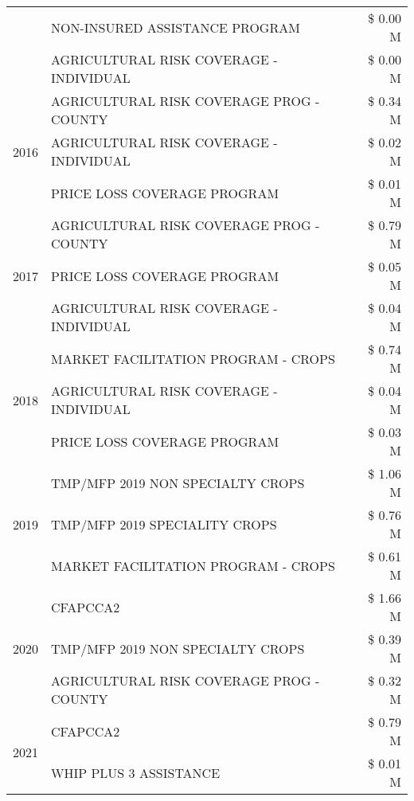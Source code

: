 \begin{tabular}{llr}
 & NON-INSURED ASSISTANCE PROGRAM & \$ 0.00 M \\
 & AGRICULTURAL RISK COVERAGE - INDIVIDUAL & \$ 0.00 M \\
\cline{1-3}
\multirow[t]{3}{*}{2016} & AGRICULTURAL RISK COVERAGE PROG - COUNTY & \$ 0.34 M \\
 & AGRICULTURAL RISK COVERAGE - INDIVIDUAL & \$ 0.02 M \\
 & PRICE LOSS COVERAGE PROGRAM & \$ 0.01 M \\
\cline{1-3}
\multirow[t]{3}{*}{2017} & AGRICULTURAL RISK COVERAGE PROG - COUNTY & \$ 0.79 M \\
 & PRICE LOSS COVERAGE PROGRAM & \$ 0.05 M \\
 & AGRICULTURAL RISK COVERAGE - INDIVIDUAL & \$ 0.04 M \\
\cline{1-3}
\multirow[t]{3}{*}{2018} & MARKET FACILITATION PROGRAM - CROPS & \$ 0.74 M \\
 & AGRICULTURAL RISK COVERAGE - INDIVIDUAL & \$ 0.04 M \\
 & PRICE LOSS COVERAGE PROGRAM & \$ 0.03 M \\
\cline{1-3}
\multirow[t]{3}{*}{2019} & TMP/MFP 2019 NON SPECIALTY CROPS & \$ 1.06 M \\
 & TMP/MFP 2019 SPECIALITY CROPS & \$ 0.76 M \\
 & MARKET FACILITATION PROGRAM - CROPS & \$ 0.61 M \\
\cline{1-3}
\multirow[t]{3}{*}{2020} & CFAPCCA2 & \$ 1.66 M \\
 & TMP/MFP 2019 NON SPECIALTY CROPS & \$ 0.39 M \\
 & AGRICULTURAL RISK COVERAGE PROG - COUNTY & \$ 0.32 M \\
\cline{1-3}
\multirow[t]{2}{*}{2021} & CFAPCCA2 & \$ 0.79 M \\
 & WHIP PLUS 3 ASSISTANCE & \$ 0.01 M \\
\cline{1-3}
\bottomrule
\end{tabular}
